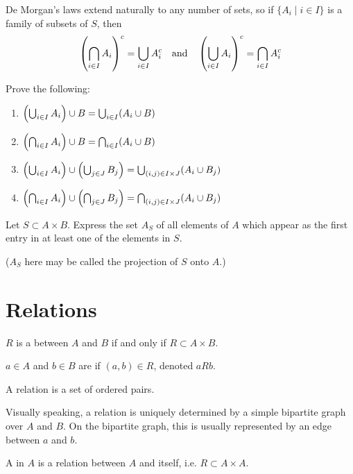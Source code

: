 De Morgan's laws extend naturally to any number of sets, so if $\{A_i \mid i \in I\}$ is a family of subsets of $S$, then
\[ \left(\bigcap_{i\in I}A_i\right)^c = \bigcup_{i\in I}A_i^c \quad \text{and} \quad \left(\bigcup_{i\in I}A_i\right)^c = \bigcap_{i\in I}A_i^c \]

\begin{exercise}
Prove the following:
\begin{enumerate}[label=(\roman*)]
\item $\left(\bigcup_{i\in I}A_i\right)\cup B=\bigcup_{i\in I}(A_i\cup B)$
\item $\left(\bigcap_{i\in I}A_i\right)\cup B=\bigcap_{i\in I}(A_i\cup B)$
\item $\left(\bigcup_{i\in I}A_i\right)\cup\left(\bigcup_{j\in J}B_j\right)=\bigcup_{(i,j)\in I\times J}(A_i\cup B_j)$
\item $\left(\bigcap_{i\in I}A_i\right)\cup\left(\bigcap_{j\in J}B_j\right)=\bigcap_{(i,j)\in I\times J}(A_i\cup B_j)$
\end{enumerate}
\end{exercise}

\begin{exercise}
Let $S\subset A\times B$. Express the set $A_S$ of all elements of $A$ which appear as the first entry in at least one of the elements in $S$.

($A_S$ here may be called the projection of $S$ onto $A$.)
\end{exercise}
\pagebreak

\section{Relations}
\begin{definition}[Relation]
$R$ is a  between $A$ and $B$ if and only if $R\subset A\times B$.

$a \in A$ and $b \in B$ are  if $(a,b) \in R$, denoted $a R b$.
\end{definition}

\begin{remark}
A relation is a set of ordered pairs.
\end{remark}

Visually speaking, a relation is uniquely determined by a simple bipartite graph over $A$ and $B$. On the bipartite graph, this is usually represented by an edge between $a$ and $b$.

\begin{definition}
A  in $A$ is a relation between $A$ and itself, i.e. $R \subset A \times A$.
\end{definition}

